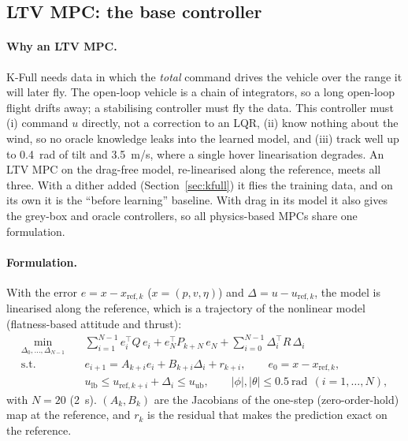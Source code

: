 \documentclass[11pt,a4paper]{article}
\newcommand{\KFull}{\textsf{K-Full}}          %
\begin{document}
	\subsection{LTV MPC: the base controller}
	\label{sec:ltv-mpc}

	\paragraph{Why an LTV MPC.} \KFull{} needs data in which the \emph{total} command drives the
	vehicle over the range it will later fly. The open-loop vehicle is a chain of integrators, so a
	long open-loop flight drifts away; a stabilising controller must fly the data. This controller
	must (i) command $u$ directly, not a correction to an LQR, (ii) know nothing about the wind, so
	no oracle knowledge leaks into the learned model, and (iii) track well up to 0.4~rad of tilt and
	3.5~m/s, where a single hover linearisation degrades. An LTV MPC on the drag-free model,
	re-linearised along the reference, meets all three. With a dither added
	(Section~\ref{sec:kfull}) it flies the training data, and on its own it is the
	``before learning'' baseline. With drag in its model it also gives the grey-box and oracle
	controllers, so all physics-based MPCs share one formulation.

	\paragraph{Formulation.} With the error $e = x - x_{\text{ref},k}$ ($x = (p, v, \eta)$) and
	$\Delta = u - u_{\text{ref},k}$, the model is linearised along the reference, which is a
	trajectory of the nonlinear model (flatness-based attitude and thrust):
	\begin{align}
		\min_{\Delta_0, \dots, \Delta_{N-1}} \quad & \sum_{i=1}^{N-1} e_i^\top Q\, e_i
		+ e_N^\top P_{k+N}\, e_N + \sum_{i=0}^{N-1} \Delta_i^\top R\, \Delta_i \\
		\text{s.t.} \quad & e_{i+1} = A_{k+i} e_i + B_{k+i} \Delta_i + r_{k+i}, \qquad e_0 = x - x_{\text{ref},k}, \\
		& u_{\text{lb}} \le u_{\text{ref},k+i} + \Delta_i \le u_{\text{ub}}, \qquad
		|\phi|, |\theta| \le 0.5~\text{rad} \ \ (i = 1, \dots, N),
	\end{align}
	with $N = 20$ (2~s). $(A_k, B_k)$ are the Jacobians of the one-step (zero-order-hold) map at the
	reference, and $r_k$ is the residual that makes the prediction exact on the reference.
\end{document}
